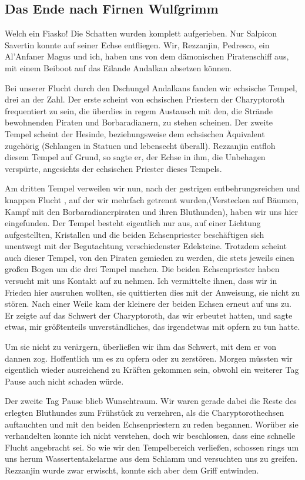 \subsection{Das Ende nach Firnen Wulfgrimm}

Welch ein Fiasko! Die Schatten wurden komplett aufgerieben. Nur Salpicon Savertin konnte auf seiner Echse entfliegen. Wir, Rezzanjin, Pedresco, ein Al'Anfaner Magus und ich, haben uns von dem dämonischen Piratenschiff aus, mit einem Beiboot auf das Eilande Andalkan absetzen können.

Bei unserer Flucht durch den Dschungel Andalkans fanden wir echsische Tempel, drei an der Zahl. Der erste scheint von echsischen Priestern der Charyptoroth frequentiert zu sein, die überdies in regem Austausch mit den, die Strände bewohnenden Piraten und Borbaradianern, zu stehen scheinen. Der zweite Tempel scheint der Hesinde, beziehungsweise dem echsischen Äquivalent zugehörig (Schlangen in Statuen und lebensecht überall). Rezzanjin entfloh diesem Tempel auf Grund, so sagte er, der Echse in ihm, die Unbehagen verspürte, angesichts der echsischen Priester dieses Tempels.

Am dritten Tempel verweilen wir nun, nach der gestrigen entbehrungsreichen und knappen Flucht , auf der wir mehrfach getrennt wurden,(Verstecken auf Bäumen, Kampf mit den Borbaradianerpiraten und ihren Bluthunden), haben wir uns hier eingefunden. Der Tempel besteht eigentlich nur aus, auf einer Lichtung aufgestellten, Kristallen und die beiden Echsenpriester beschäftigen sich unentwegt mit der Begutachtung verschiedenster Edelsteine. Trotzdem scheint auch dieser Tempel, von den Piraten gemieden zu werden, die stets jeweils einen großen Bogen um die drei Tempel machen. Die beiden Echsenpriester haben versucht mit uns Kontakt auf zu nehmen. Ich vermittelte ihnen, dass wir in Frieden hier ausruhen wollten, sie quittierten dies mit der Anweisung, sie nicht zu stören. Nach einer Weile kam der kleinere der beiden Echsen erneut auf uns zu. Er zeigte auf das Schwert der Charyptoroth, das wir erbeutet hatten, und sagte etwas, mir größtenteils unverständliches, das irgendetwas mit opfern zu tun hatte.

Um sie nicht zu verärgern, überließen wir ihm das Schwert, mit dem er von dannen zog. Hoffentlich um es zu opfern oder zu zerstören. Morgen müssten wir eigentlich wieder ausreichend zu Kräften gekommen sein, obwohl ein weiterer Tag Pause auch nicht schaden würde.

Der zweite Tag Pause blieb Wunschtraum. Wir waren gerade dabei die Reste des erlegten Bluthundes zum Frühstück zu verzehren, als die Charyptorothechsen auftauchten und mit den beiden Echsenpriestern zu reden begannen. Worüber sie verhandelten konnte ich nicht verstehen, doch wir beschlossen, dass eine schnelle Flucht angebracht sei. So wie wir den Tempelbereich verließen, schossen rings um uns herum Wassertentakelarme aus dem Schlamm und versuchten uns zu greifen. Rezzanjin wurde zwar erwischt, konnte sich aber dem Griff entwinden.

